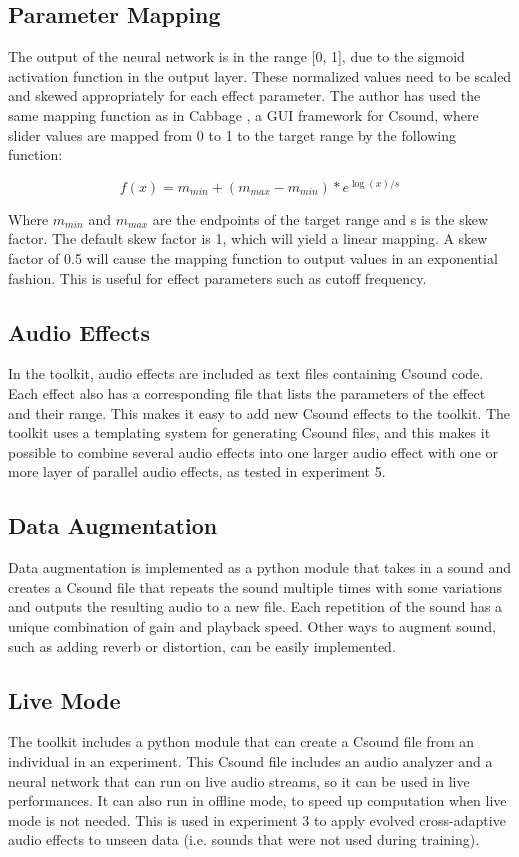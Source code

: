 \subsection{Parameter Mapping}
The output of the neural network is in the range [0, 1], due to the sigmoid activation function in the output layer. These normalized values need to be scaled and skewed appropriately for each effect parameter. The author has used the same mapping function as in Cabbage \citep{walsh2008}, a GUI framework for Csound, where slider values are mapped from 0 to 1 to the target range by the following function:

$$f(x)=m_{min}+(m_{max}-m_{min})*e^{\log(x)/s}$$

Where $m_{min}$ and $m_{max}$ are the endpoints of the target range and s is the skew factor. The default skew factor is 1, which will yield a linear mapping. A skew factor of 0.5 will cause the mapping function to output values in an exponential fashion. This is useful for effect parameters such as cutoff frequency.

\subsection{Audio Effects}
In the toolkit, audio effects are included as text files containing Csound code. Each effect also has a corresponding file that lists the parameters of the effect and their range. This makes it easy to add new Csound effects to the toolkit. The toolkit uses a templating system for generating Csound files, and this makes it possible to combine several audio effects into one larger audio effect with one or more layer of parallel audio effects, as tested in experiment 5.

\subsection{Data Augmentation}
Data augmentation is implemented as a python module that takes in a sound and creates a Csound file that repeats the sound multiple times with some variations and outputs the resulting audio to a new file. Each repetition of the sound has a unique combination of gain and playback speed. Other ways to augment sound, such as adding reverb or distortion, can be easily implemented.

\subsection{Live Mode}
The toolkit includes a python module that can create a Csound file from an individual in an experiment. This Csound file includes an audio analyzer and a neural network that can run on live audio streams, so it can be used in live performances. It can also run in offline mode, to speed up computation when live mode is not needed. This is used in experiment 3 to apply evolved cross-adaptive audio effects to unseen data (i.e. sounds that were not used during training).

